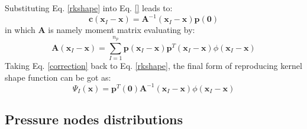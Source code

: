 Substituting Eq. \ref{rkshape} into Eq. \eqref{} leads to:
\begin{equation}\label{correction}
\boldsymbol c(\boldsymbol x_I-\boldsymbol x) = \boldsymbol A^{-1}(\boldsymbol x_I-\boldsymbol x)\boldsymbol p(\boldsymbol 0)
\end{equation}
in which $\boldsymbol A$ is namely moment matrix evaluating by:
\begin{equation}
\boldsymbol A(\boldsymbol x_I-\boldsymbol x) = \sum_{I=1}^{n_p}\boldsymbol p(\boldsymbol x_I-\boldsymbol x) \boldsymbol p^T(\boldsymbol x_I-\boldsymbol x)\phi(\boldsymbol x_I-\boldsymbol x)
\end{equation}
Taking Eq. \eqref{correction} back to Eq. \eqref{rkshape}, the final form of reproducing kernel shape function can be got as:
\begin{equation}
\Psi_I(\boldsymbol x) = \boldsymbol p^T(\boldsymbol 0) \boldsymbol A^{-1}(\boldsymbol x_I-\boldsymbol x)\phi(\boldsymbol x_I-\boldsymbol x)
\end{equation}

\subsection{Pressure nodes distributions}